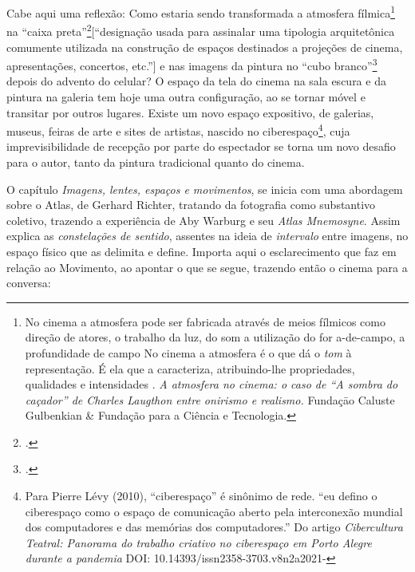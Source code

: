Cabe aqui uma reflexão: Como estaria sendo transformada a atmosfera
fílmica\footnote{No cinema a atmosfera pode ser fabricada através de
	meios fílmicos como direção de atores, o trabalho da luz, do som
	\textelp{} a utilização do for a-de-campo, a profundidade de campo
	\textelp{} No cinema a atmosfera é o que dá o \emph{tom} à
	representação. É ela que a caracteriza, atribuindo-lhe propriedades,
	qualidades e intensidades \parencite{gil2005atmosfera}. \emph{A atmosfera no cinema: o caso de
		\enquote{A sombra do caçador} de Charles Laugthon entre onirismo e
		realismo.} Fundaçāo Caluste Gulbenkian \& Fundação para a Ciência e
	Tecnologia.} na \enquote{caixa
	preta}\footcite[Segundo][40]{porras2010entre}[\enquote{designação usada
		para assinalar uma tipologia arquitetônica comumente utilizada na
		construção de espaços destinados a projeções de cinema, apresentações,
		concertos, etc.}] e nas imagens da pintura no \enquote{cubo
	branco}\footcite[Designação usada para indicar os espaços de exibição
	próprios das artes plásticas e/ou visuais, tais como museus e galerias.
	(p.~46)]{porras2010entre} depois do advento do celular? O espaço da
tela do cinema na sala escura e da pintura na galeria tem hoje uma
outra configuração, ao se tornar móvel e transitar por outros lugares.
Existe um novo espaço expositivo, de galerias, museus, feiras de arte e
sites de artistas, nascido no ciberespaço\footnote{Para Pierre Lévy
	(2010), \enquote{ciberespaço} é sinônimo de rede. \enquote{eu defino o
		ciberespaço como o espaço de comunicação aberto pela interconexão
		mundial dos computadores e das memórias dos computadores.} Do artigo
	\emph{Cibercultura Teatral: Panorama do trabalho criativo no
		ciberespaço em Porto Alegre durante a pandemia} DOI:
	10.14393/issn2358-3703.v8n2a2021-}, cuja imprevisibilidade de recepção
por parte do espectador se torna um novo desafio para o autor, tanto da
pintura tradicional quanto do cinema.

O capítulo \emph{Imagens, lentes, espaços e movimentos}, se inicia com
uma abordagem sobre o Atlas, de Gerhard Richter, tratando da fotografia
como substantivo coletivo, trazendo a experiência de Aby Warburg e seu
\emph{Atlas Mnemosyne}. Assim \textcite{sardo2017exercicio} explica as
\emph{constelações de sentido}, assentes na ideia de \emph{intervalo}
entre imagens, no espaço físico que as delimita e define. Importa aqui
o esclarecimento que \textcite{sardo2017exercicio} faz em relação ao
Movimento, ao apontar o que se segue, trazendo então o cinema para a
conversa:

